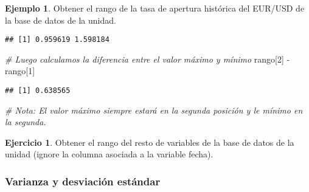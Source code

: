\documentclass[
]{book}
\newenvironment{Shaded}{\begin{snugshade}}{\end{snugshade}}
\newcommand{\AttributeTok}[1]{\textcolor[rgb]{0.77,0.63,0.00}{#1}}
\newcommand{\CommentTok}[1]{\textcolor[rgb]{0.56,0.35,0.01}{\textit{#1}}}
\newcommand{\DecValTok}[1]{\textcolor[rgb]{0.00,0.00,0.81}{#1}}
\newcommand{\FunctionTok}[1]{\textcolor[rgb]{0.00,0.00,0.00}{#1}}
\newcommand{\NormalTok}[1]{#1}
\newcommand{\SpecialCharTok}[1]{\textcolor[rgb]{0.00,0.00,0.00}{#1}}
\theoremstyle{definition}
\theoremstyle{definition}
\newtheorem{example}{Ejemplo}[chapter]
\theoremstyle{definition}
\newtheorem{exercise}{Ejercicio}[chapter]
\theoremstyle{definition}
\theoremstyle{remark}
\begin{document}
\begin{example}
Obtener el rango de la tasa de apertura histórica del EUR/USD de la base de datos de la unidad.
\end{example}

\begin{Shaded}
\end{Shaded}

\begin{verbatim}
## [1] 0.959619 1.598184
\end{verbatim}

\begin{Shaded}
\begin{Highlighting}[]
\CommentTok{\# Luego calculamos la diferencia entre el valor máximo y mínimo}
\NormalTok{rango[}\DecValTok{2}\NormalTok{] }\SpecialCharTok{{-}}\NormalTok{ rango[}\DecValTok{1}\NormalTok{]}
\end{Highlighting}
\end{Shaded}

\begin{verbatim}
## [1] 0.638565
\end{verbatim}

\begin{Shaded}
\begin{Highlighting}[]
\CommentTok{\# Nota: El valor máximo siempre estará en la segunda posición y le mínimo en la segunda.}
\end{Highlighting}
\end{Shaded}

\begin{exercise}
Obtener el rango del resto de variables de la base de datos de la unidad (ignore la columna asociada a la variable fecha).
\end{exercise}

\hypertarget{varianza-y-desviaciuxf3n-estuxe1ndar}{%
\subsubsection*{Varianza y desviación estándar}\label{varianza-y-desviaciuxf3n-estuxe1ndar}}
\end{document}
